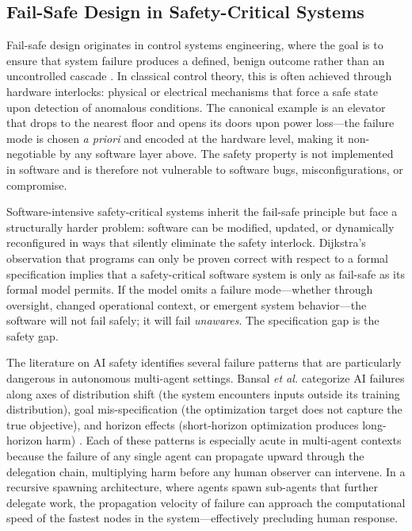 \subsection{Fail-Safe Design in Safety-Critical Systems}

Fail-safe design originates in control systems engineering, where the goal is to ensure that system failure produces a defined, benign outcome rather than an uncontrolled cascade \cite{tristr81}. In classical control theory, this is often achieved through hardware interlocks: physical or electrical mechanisms that force a safe state upon detection of anomalous conditions. The canonical example is an elevator that drops to the nearest floor and opens its doors upon power loss—the failure mode is chosen \emph{a priori} and encoded at the hardware level, making it non-negotiable by any software layer above. The safety property is not implemented in software and is therefore not vulnerable to software bugs, misconfigurations, or compromise.

Software-intensive safety-critical systems inherit the fail-safe principle but face a structurally harder problem: software can be modified, updated, or dynamically reconfigured in ways that silently eliminate the safety interlock. Dijkstra's observation that programs can only be proven correct with respect to a formal specification \cite{dijkstra1982} implies that a safety-critical software system is only as fail-safe as its formal model permits. If the model omits a failure mode—whether through oversight, changed operational context, or emergent system behavior—the software will not fail safely; it will fail \emph{unawares}. The specification gap is the safety gap.

The literature on AI safety identifies several failure patterns that are particularly dangerous in autonomous multi-agent settings. Bansal \emph{et al.} categorize AI failures along axes of distribution shift (the system encounters inputs outside its training distribution), goal mis-specification (the optimization target does not capture the true objective), and horizon effects (short-horizon optimization produces long-horizon harm) \cite{bansal2019}. Each of these patterns is especially acute in multi-agent contexts because the failure of any single agent can propagate upward through the delegation chain, multiplying harm before any human observer can intervene. In a recursive spawning architecture, where agents spawn sub-agents that further delegate work, the propagation velocity of failure can approach the computational speed of the fastest nodes in the system—effectively precluding human response.

